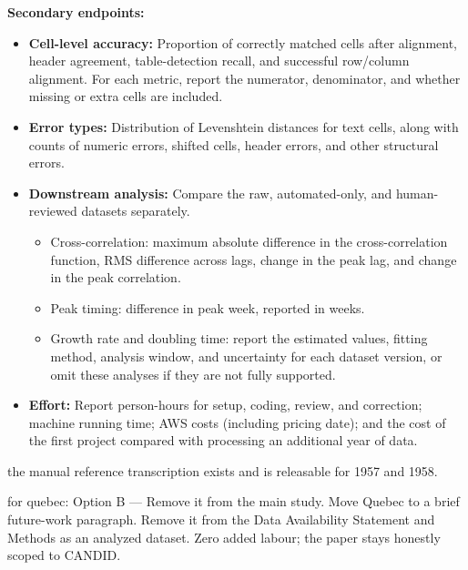 \documentclass[12pt]{article}
\begin{document}
\textbf{Secondary endpoints:}
\begin{itemize}
    \item \textbf{Cell-level accuracy:} Proportion of correctly matched cells after alignment, header agreement, table-detection recall, and successful row/column alignment. For each metric, report the numerator, denominator, and whether missing or extra cells are included.
    \item \textbf{Error types:} Distribution of Levenshtein distances for text cells, along with counts of numeric errors, shifted cells, header errors, and other structural errors.
    \item \textbf{Downstream analysis:} Compare the raw, automated-only, and human-reviewed datasets separately.
    \begin{itemize}
        \item Cross-correlation: maximum absolute difference in the cross-correlation function, RMS difference across lags, change in the peak lag, and change in the peak correlation.
        \item Peak timing: difference in peak week, reported in weeks.
        \item Growth rate and doubling time: report the estimated values, fitting method, analysis window, and uncertainty for each dataset version, or omit these analyses if they are not fully supported.
    \end{itemize}
    \item \textbf{Effort:} Report person-hours for setup, coding, review, and correction; machine running time; AWS costs (including pricing date); and the cost of the first project compared with processing an additional year of data.
\end{itemize}

the manual reference transcription exists and is releasable for 1957 and 1958.

for quebec: Option B — Remove it from the main study. Move Quebec to a brief future-work paragraph. Remove it from the Data Availability Statement and Methods as an analyzed dataset. Zero added labour; the paper stays honestly scoped to CANDID.
\end{document}
